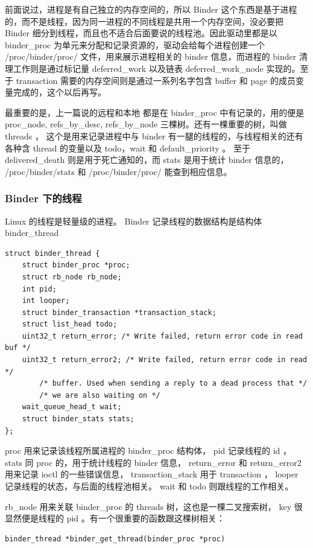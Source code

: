 \documentclass[a4paper,11pt]{article}
\begin{document}
前面说过，进程是有自己独立的内存空间的，所以 Binder
这个东西是基于进程的，而不是线程，因为同一进程的不同线程是共用一个内存空间，没必要把
Binder 细分到线程，而且也不适合后面要说的线程池。因此驱动里都是以 binder_proc
为单元来分配和记录资源的，驱动会给每个进程创建一个 /proc/binder/proc/
文件，用来展示进程相关的 binder 信息，而进程的 binder 清理工作则是通过标记量
deferred_work 以及链表 deferred_work_node 实现的。至于 transaction
需要的内存空间则是通过一系列名字包含 buffer 和 page
的成员变量完成的，这个以后再写。


最重要的是，上一篇说的远程和本地 \binder 都是在 binder_proc
中有记录的，用的便是 proc_node, refs_by_desc, refs_by_node
三棵树。还有一棵重要的树，叫做 threads ， 这个是用来记录进程中与 binder
有一腿的线程的，与线程相关的还有各种含 thread 的变量以及 todo，wait 和
default_priority 。 至于 delivered_death 则是用于死亡通知的，而 stats 是用于统计
binder 信息的， /proc/binder/stats 和 /proc/binder/proc/ 能查到相应信息。

\subsubsection{Binder 下的线程}
Linux 的线程是轻量级的进程。 Binder 记录线程的数据结构是结构体 binder_thread
\begin{lstlisting}
struct binder_thread {
	struct binder_proc *proc;
	struct rb_node rb_node;
	int pid;
	int looper;
	struct binder_transaction *transaction_stack;
	struct list_head todo;
	uint32_t return_error; /* Write failed, return error code in read buf */
	uint32_t return_error2; /* Write failed, return error code in read */
		/* buffer. Used when sending a reply to a dead process that */
		/* we are also waiting on */
	wait_queue_head_t wait;
	struct binder_stats stats;
};
\end{lstlisting}

 proc 用来记录该线程所属进程的 binder_proc 结构体， pid 记录线程的 id ， stats
同 proc 的，用于统计线程的 binder 信息， return_error 和 return_error2 用来记录
ioctl 的一些错误信息， transaction_stack 用于 transaction ， looper
记录线程的状态，与后面的线程池相关。 wait 和 todo 则跟线程的工作相关。 

 rb_node 用来关联 binder_proc 的 threads 树，这也是一棵二叉搜索树， key
很显然便是线程的 pid 。有一个很重要的函数跟这棵树相关：
\begin{lstlisting}
binder_thread *binder_get_thread(binder_proc *proc)
\end{lstlisting}
\end{document}
